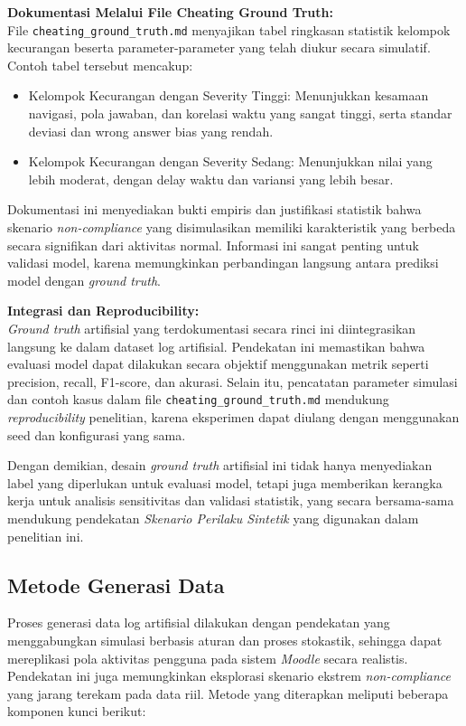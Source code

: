 \textbf{Dokumentasi Melalui File Cheating Ground Truth:} \\
File \texttt{cheating\_ground\_truth.md} menyajikan tabel ringkasan statistik kelompok kecurangan beserta parameter-parameter yang telah diukur secara simulatif. Contoh tabel tersebut mencakup:
\begin{itemize}
    \item Kelompok Kecurangan dengan Severity Tinggi: Menunjukkan kesamaan navigasi, pola jawaban, dan korelasi waktu yang sangat tinggi, serta standar deviasi dan wrong answer bias yang rendah.
    \item Kelompok Kecurangan dengan Severity Sedang: Menunjukkan nilai yang lebih moderat, dengan delay waktu dan variansi yang lebih besar.
\end{itemize}

Dokumentasi ini menyediakan bukti empiris dan justifikasi statistik bahwa skenario \textit{non-compliance} yang disimulasikan memiliki karakteristik yang berbeda secara signifikan dari aktivitas normal. Informasi ini sangat penting untuk validasi model, karena memungkinkan perbandingan langsung antara prediksi model dengan \textit{ground truth}.

\textbf{Integrasi dan Reproducibility:} \\
\textit{Ground truth} artifisial yang terdokumentasi secara rinci ini diintegrasikan langsung ke dalam dataset log artifisial. Pendekatan ini memastikan bahwa evaluasi model dapat dilakukan secara objektif menggunakan metrik seperti precision, recall, F1-score, dan akurasi. Selain itu, pencatatan parameter simulasi dan contoh kasus dalam file \texttt{cheating\_ground\_truth.md} mendukung \textit{reproducibility} penelitian, karena eksperimen dapat diulang dengan menggunakan seed dan konfigurasi yang sama.

Dengan demikian, desain \textit{ground truth} artifisial ini tidak hanya menyediakan label yang diperlukan untuk evaluasi model, tetapi juga memberikan kerangka kerja untuk analisis sensitivitas dan validasi statistik, yang secara bersama-sama mendukung pendekatan \textit{Skenario Perilaku Sintetik} yang digunakan dalam penelitian ini.

\subsection{Metode Generasi Data}
\label{sec:metodeGenerasiData}
Proses generasi data log artifisial dilakukan dengan pendekatan yang menggabungkan simulasi berbasis aturan dan proses stokastik, sehingga dapat mereplikasi pola aktivitas pengguna pada sistem \textit{Moodle} secara realistis. Pendekatan ini juga memungkinkan eksplorasi skenario ekstrem \textit{non-compliance} yang jarang terekam pada data riil. Metode yang diterapkan meliputi beberapa komponen kunci berikut:

